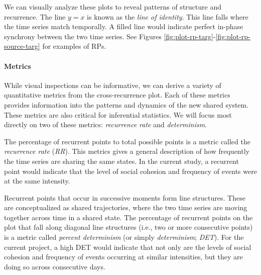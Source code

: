 \documentclass[
  english,
  man]{apa6}
\let\oldparagraph\paragraph
\renewcommand{\paragraph}[1]{\oldparagraph{#1}\mbox{}}
\begin{document}
We can visually analyze these plots to reveal patterns of structure and
recurrence. The line \(y = x\) is known as the \emph{line of identity}. This line falls
where the time series match temporally. A filled line would indicate perfect
in-phase synchrony between the two time series. See Figures
\ref{fig:plot-rp-targ}-\ref{fig:plot-rp-source-targ} for examples of
RPs.

\hypertarget{metrics}{%
\paragraph{Metrics}\label{metrics}}

While visual inspections can be informative, we can derive a variety of
quantitative metrics from the cross-recurrence plot. Each of these metrics
provides information into the patterns and dynamics of the new shared system.
These metrics are also critical for inferential statistics. We will focus most
directly on two of these metrics: \emph{recurrence rate} and \emph{determinism}.

The percentage of recurrent points to total possible points is a metric called
the \emph{recurrence rate} (\emph{RR}). This metrics gives a general description of how
frequently the time series are sharing the same states. In the current study, a
recurrent point would indicate that the level of social cohesion and frequency
of events were at the same intensity.

Recurrent points that occur in successive moments form line structures. These
are conceptualized as shared trajectories, where the two time series are moving
together across time in a shared state. The percentage of recurrent points on
the plot that fall along diagonal line structures (i.e., two or more consecutive
points) is a metric called \emph{percent determinism} (or simply \emph{determinism};
\emph{DET}). For the current project, a high DET would indicate that not only are the
levels of social cohesion and frequency of events occurring at similar
intensities, but they are doing so across consecutive days.
\end{document}
